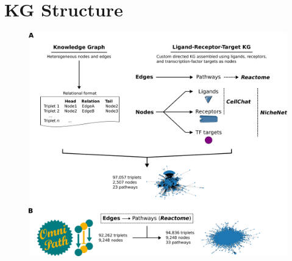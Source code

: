 


\section{KG Structure}

\begin{figure}
    \centering
    \includegraphics{06kg/figs/6KG_kg.png}
    \caption{}
    \label{fig:6kg}
\end{figure}

